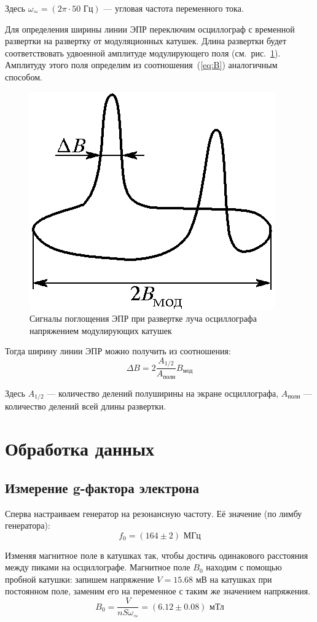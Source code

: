 \documentclass[reprint, nofootinbib, nobalancelastpage, 10pt]{revtex4-2}
\begin{document}
Здесь $\omega_{\simeq} = (2 \pi \cdot 50 \text{ Гц})$ --- угловая частота переменного тока.

Для определения ширины линии ЭПР переключим осциллограф с временной развертки на развертку
от модуляционных катушек. Длина развертки будет соответствовать удвоенной амплитуде
модулирующего поля (см.~рис.~\ref{img:5}). Амплитуду этого поля определим из соотношения~(\ref{eq:B}) аналогичным
способом.

\begin{figure}[h!]
	\includegraphics[width=0.5\linewidth]{5.png}
	\caption{Сигналы поглощения ЭПР при развертке луча осциллографа напряжением
				модулирующих катушек}
	\label{img:5}
\end{figure}

Тогда ширину линии ЭПР можно получить из соотношения:
\begin{equation}
	\Delta B = 2 \dfrac{A_{1/2}}{A_{\text{полн}}} B_{\text{мод}}
\end{equation}

Здесь $A_{1/2}$ --- количество делений полуширины на экране осциллографа,
$A_{\text{полн}}$ --- количество делений всей длины развертки.

\section*{Обработка данных}

\subsection{Измерение g-фактора электрона}

Сперва настраиваем генератор на резонансную частоту. Её значение (по лимбу генератора):
\[f_0 = (164 \pm 2) \text{ МГц}\]

Изменяя магнитное поле в катушках так, чтобы достичь одинакового расстояния между пиками
на осциллографе. Магнитное поле $B_0$ находим с помощью пробной катушки: запишем
напряжение $V = 15.68$ мВ на катушках при постоянном поле, заменим его на переменное с
таким же значением напряжения.
\[ B_0 = \dfrac{V}{n S \omega_{\simeq}} = (6.12 \pm 0.08) \text{ мТл} \]
\end{document}
